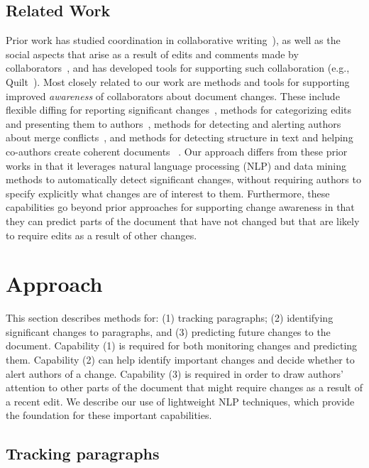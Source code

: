 \subsection{Related Work}\label{related-work}

Prior work has studied coordination in collaborative
writing~\cite[interalia]{neuwirth2001computer,kittur2007he}), as well as
the social aspects that arise as a result of edits and comments made by
collaborators~\cite{birnholtz2013write}, and has developed tools for
supporting such collaboration (e.g., Quilt~\cite{fish1988quilt}). Most
closely related to our work are methods and tools for supporting
improved \emph{awareness} of collaborators about document changes. These
include flexible diffing for reporting significant
changes~\cite{neuwirth1992flexible}, methods for categorizing edits and
presenting them to
authors~\cite{fong2010did,papadopoulou2007structured,tam2006framework},
methods for detecting and alerting authors about merge
conflicts~\cite{hainsworth2006enabling}, and methods for detecting
structure in text and helping co-authors create coherent documents~
\cite{de2007narrative}. Our approach differs from these prior works in
that it leverages natural language processing (NLP) and data mining
methods to automatically detect significant changes, without requiring
authors to specify explicitly what changes are of interest to them.
Furthermore, these capabilities go beyond prior approaches for
supporting change awareness in that they can predict parts of the
document that have not changed but that are likely to require edits as a
result of other changes.

\section{Approach}\label{approach}

This section describes methods for: (1) tracking paragraphs; (2)
identifying significant changes to paragraphs, and (3) predicting future
changes to the document. Capability (1) is required for both monitoring
changes and predicting them. Capability (2) can help identify important
changes and decide whether to alert authors of a change. Capability (3)
is required in order to draw authors' attention to other parts of the
document that might require changes as a result of a recent edit. We
describe our use of lightweight NLP techniques, which provide the
foundation for these important capabilities.

\subsection{Tracking paragraphs}\label{tracking-paragraphs}

